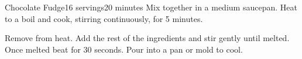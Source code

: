\documentclass[../Cookbook.tex]{subfiles}
\begin{document}
\begin{recipe}[ChocolateFudge]{Chocolate Fudge}{16 servings}{20 minutes}
Mix together in a medium saucepan.
Heat to a boil and cook, stirring continuously, for 5 minutes.

Remove from heat.
Add the rest of the ingredients and stir gently until melted.
Once melted beat for 30 seconds.
Pour into a pan or mold to cool.

\end{recipe}
\end{document}

